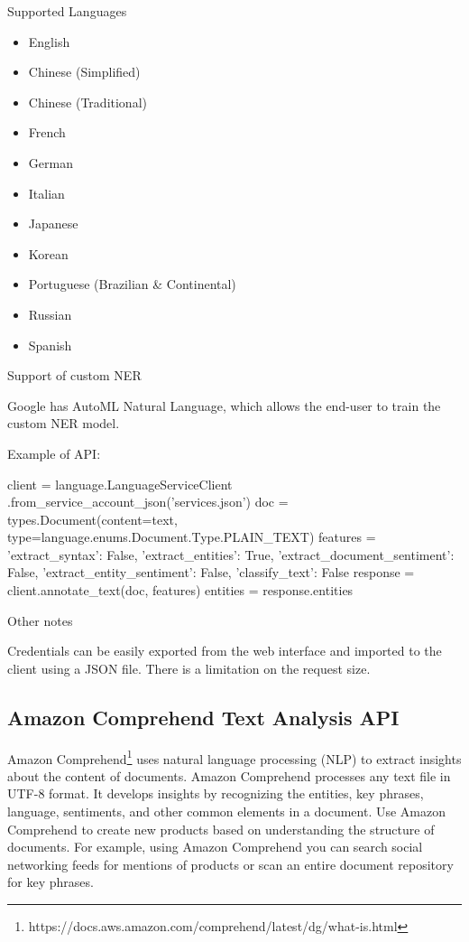 \documentclass[conference]{IEEEtran}
\begin{document}
Supported Languages

\begin{itemize}
	\item English
	\item Chinese (Simplified)
	\item Chinese (Traditional)
	\item French
	\item German
	\item Italian
	\item Japanese
	\item Korean
	\item Portuguese (Brazilian \& Continental)
	\item Russian
	\item Spanish
\end{itemize}

Support of custom NER

Google has AutoML Natural Language, which allows the end-user to train the custom NER model.

Example of API:

\begin{verbatimtab}[4]
client = language.LanguageServiceClient
	.from_service_account_json('services.json')
doc = types.Document(content=text, 
	type=language.enums.Document.Type.PLAIN_TEXT)
features = {'extract_syntax': False, 
	'extract_entities': True, 
	'extract_document_sentiment': False, 
	'extract_entity_sentiment': False,
	'classify_text': False}
response = client.annotate_text(doc, features)
entities = response.entities
\end{verbatimtab}

Other notes

Credentials can be easily exported from the web interface and imported to the client using a JSON file. There is a limitation on the request size. 

\subsection{Amazon Comprehend Text Analysis API}

Amazon Comprehend\footnote{https://docs.aws.amazon.com/comprehend/latest/dg/what-is.html} uses natural language processing (NLP) to extract insights about the content of documents. Amazon Comprehend processes any text file in UTF-8 format. It develops insights by recognizing the entities, key phrases, language, sentiments, and other common elements in a document. Use Amazon Comprehend to create new products based on understanding the structure of documents. For example, using Amazon Comprehend you can search social networking feeds for mentions of products or scan an entire document repository for key phrases.
\end{document}
